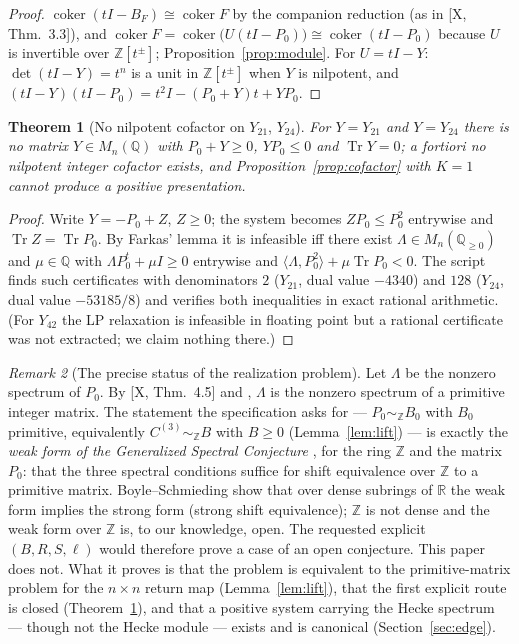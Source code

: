 \documentclass[11pt]{amsart}
\numberwithin{equation}{section}
\newtheorem{theorem}{Theorem}[section]
\theoremstyle{definition}
\theoremstyle{remark}
\newtheorem{remark}[theorem]{Remark}
\newcommand{\Z}{\mathbb{Z}}
\newcommand{\Q}{\mathbb{Q}}
\newcommand{\R}{\mathbb{R}}
\newcommand{\coker}{\operatorname{coker}}
\newcommand{\Tr}{\operatorname{Tr}}
\newcommand{\Cthree}{C^{(3)}}
\newcommand{\SE}{\sim_{\Z}}
\begin{document}
\begin{proof}
$\coker(tI-B_F)\cong\coker F$ by the companion reduction (as in [X, Thm.~3.3]), and
$\coker F=\coker\bigl(U(tI-P_0)\bigr)\cong\coker(tI-P_0)$ because $U$ is invertible over
$\Z[t^{\pm}]$; Proposition~\ref{prop:module}. For $U=tI-Y$: $\det(tI-Y)=t^{n}$ is a unit in
$\Z[t^{\pm}]$ when $Y$ is nilpotent, and $(tI-Y)(tI-P_0)=t^{2}I-(P_0+Y)t+YP_0$.
\end{proof}

\begin{theorem}[No nilpotent cofactor on $Y_{21}$, $Y_{24}$]\label{thm:nocofactor}
For $Y=Y_{21}$ and $Y=Y_{24}$ there is no matrix $Y\in M_n(\Q)$ with $P_0+Y\ge0$,
$YP_0\le0$ and $\Tr Y=0$; a fortiori no nilpotent integer cofactor exists, and
Proposition~\ref{prop:cofactor} with $K=1$ cannot produce a positive presentation.
\end{theorem}

\begin{proof}
Write $Y=-P_0+Z$, $Z\ge0$; the system becomes $ZP_0\le P_0^{2}$ entrywise and $\Tr Z=\Tr P_0$.
By Farkas' lemma it is infeasible iff there exist $\Lambda\in M_n(\Q_{\ge0})$ and $\mu\in\Q$
with $\Lambda P_0^{t}+\mu I\ge0$ entrywise and $\langle\Lambda,P_0^{2}\rangle+\mu\Tr P_0<0$.
The script finds such certificates with denominators $2$ ($Y_{21}$, dual value $-4340$) and
$128$ ($Y_{24}$, dual value $-53185/8$) and verifies both inequalities in exact rational
arithmetic. (For $Y_{42}$ the LP relaxation is infeasible in floating point but a rational
certificate was not extracted; we claim nothing there.)
\end{proof}

\begin{remark}[The precise status of the realization problem]\label{rem:status}
Let $\Lambda$ be the nonzero spectrum of $P_0$. By [X, Thm.~4.5] and \cite{KOR}, $\Lambda$ is
the nonzero spectrum of a primitive integer matrix. The statement the specification asks
for --- $P_0\SE B_0$ with $B_0$ primitive, equivalently $\Cthree\SE B$ with $B\ge0$
(Lemma~\ref{lem:lift}) --- is exactly the \emph{weak form of the Generalized Spectral
Conjecture} \cite[p.~253]{BH91}, \cite[p.~124]{BH93} for the ring $\Z$ and the matrix $P_0$:
that the three spectral conditions suffice for shift equivalence over $\Z$ to a primitive
matrix. Boyle--Schmieding \cite{BS} show that over dense subrings of $\R$ the weak form
implies the strong form (strong shift equivalence); $\Z$ is not dense and the weak form over
$\Z$ is, to our knowledge, open. The requested explicit $(B,R,S,\ell)$ would therefore prove
a case of an open conjecture. This paper does not. What it proves is that the problem is
equivalent to the primitive-matrix problem for the $n\times n$ return map
(Lemma~\ref{lem:lift}), that the first explicit route is closed
(Theorem~\ref{thm:nocofactor}), and that a positive system carrying the Hecke spectrum ---
though not the Hecke module --- exists and is canonical (Section~\ref{sec:edge}).
\end{remark}
\end{document}
